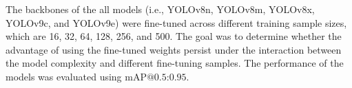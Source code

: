 The backbones of the all models (i.e., YOLOv8n, YOLOv8m, YOLOv8x, YOLOv9c, and YOLOv9e) were fine-tuned across different training sample sizes, which are 16, 32, 64, 128, 256, and 500. The goal was to determine whether the advantage of using the fine-tuned weights persist under the interaction between the model complexity and different fine-tuning samples. The performance of the models was evaluated using $\text{mAP@{0.5:0.95}}$.




